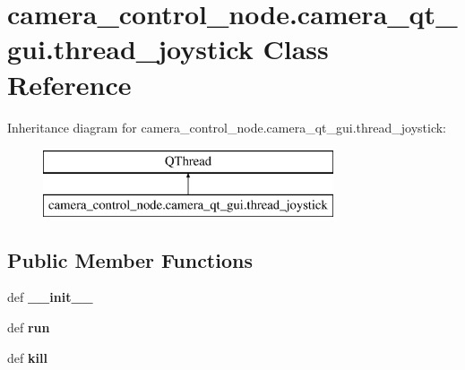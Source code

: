 \hypertarget{classcamera__control__node_1_1camera__qt__gui_1_1thread__joystick}{\section{camera\-\_\-control\-\_\-node.\-camera\-\_\-qt\-\_\-gui.\-thread\-\_\-joystick Class Reference}
\label{classcamera__control__node_1_1camera__qt__gui_1_1thread__joystick}
}
Inheritance diagram for camera\-\_\-control\-\_\-node.\-camera\-\_\-qt\-\_\-gui.\-thread\-\_\-joystick\-:\begin{figure}[H]
\begin{center}
\leavevmode
\includegraphics[height=2.000000cm]{classcamera__control__node_1_1camera__qt__gui_1_1thread__joystick}
\end{center}
\end{figure}
\subsection*{Public Member Functions}
\begin{DoxyCompactItemize}
\item 
\hypertarget{classcamera__control__node_1_1camera__qt__gui_1_1thread__joystick_a2834483cb6e2a15b9954b670d58f69ef}{def {\bfseries \-\_\-\-\_\-init\-\_\-\-\_\-}}\label{classcamera__control__node_1_1camera__qt__gui_1_1thread__joystick_a2834483cb6e2a15b9954b670d58f69ef}

\item 
\hypertarget{classcamera__control__node_1_1camera__qt__gui_1_1thread__joystick_ab746b4a7047a850cfd5c9e3c321d2c38}{def {\bfseries run}}\label{classcamera__control__node_1_1camera__qt__gui_1_1thread__joystick_ab746b4a7047a850cfd5c9e3c321d2c38}

\item 
\hypertarget{classcamera__control__node_1_1camera__qt__gui_1_1thread__joystick_ac0f60b163bab3c3d3c80c304b3bc679b}{def {\bfseries kill}}\label{classcamera__control__node_1_1camera__qt__gui_1_1thread__joystick_ac0f60b163bab3c3d3c80c304b3bc679b}

\end{DoxyCompactItemize}
